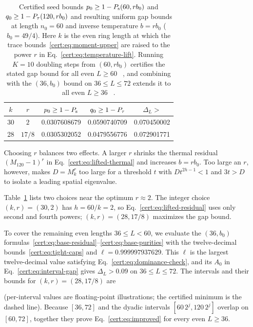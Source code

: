 \begin{table}[t]
    \caption{Certified seed bounds $p_0\ge1-P_{\mathrm s}(60,rb_0)$ and
        $q_0\ge1-P_{\tau}(120,rb_0)$%
        and resulting uniform gap bounds at length
        $n_0=60$ and inverse temperature $b=rb_0$ ($b_0=49/4$). Here $k$ is the
        even ring length at which the trace bounds~\eqref{cert:eq:moment-upper}
        are raised to the power $r$ in Eq.~\eqref{cert:eq:temperature-lift}.
        Running $K=10$ doubling steps from $(60,rb_0)$ certifies the stated gap
        bound for all even $L\ge60$%
        ~,
        and combining with the $(36,b_0)$ bound on
        $36\le L\le72$ extends it to all even $L\ge36$%
        ~.}
    \label{cert:tab:lifted}
    \begin{tabular}{@{}ccccc@{}}
        \toprule
        $k$ & $r$    & $p_0\ge1-P_{\mathrm s}$ & $q_0\ge1-P_{\tau}$ & $\Delta_L>$ \\
        \midrule
        30  & $2$    & 0.0307608679  & 0.0590740709  & 0.070450002 \\
        28  & $17/8$ & 0.0305302052  & 0.0479556776  & 0.072901771 \\
        \bottomrule
    \end{tabular}
\end{table}

Choosing $r$ balances two effects. A larger $r$ shrinks the thermal
residual $(M_{120}-1)^r$ in Eq.~\eqref{cert:eq:lifted-thermal} and
increases $b=rb_0$. Too large an $r$, however, makes $D=M_k^r$ too large
for a threshold $t$ with $Dt^{2h-1}<1$ and $3t>D$ to isolate a leading spatial
eigenvalue.

Table~\ref{cert:tab:lifted} lists two choices near the optimum
$r\approx2$. The integer choice $(k,r)=(30,2)$ has $h=60/k=2$, so
Eq.~\eqref{cert:eq:lifted-residual} uses only second and fourth powers;
$(k,r)=(28,17/8)$ maximizes the gap bound.

To cover the remaining even lengths $36\le L<60$, we evaluate the
$(36,b_0)$ formulas~\eqref{cert:eq:base-residual}--\eqref{cert:eq:base-purities}
with the twelve-decimal bounds~\eqref{cert:eq:tight-caps} and
$\ell=0.999997937629$. This $\ell$ is the largest twelve-decimal value
satisfying Eq.~\eqref{cert:eq:dominance-check}, and its $A_0$ in
Eq.~\eqref{cert:eq:interval-gap} gives $\Delta_L>0.09$ on $36\le L\le72$.
The intervals and their bounds for $(k,r)=(28,17/8)$ are
\begin{proofdiagram}
    \coveragefigure
\end{proofdiagram}
(per-interval values are floating-point illustrations; the certified
minimum is the dashed line). Because $[36,72]$ and the dyadic intervals
$[60\,2^j,120\,2^j]$ overlap on $[60,72]$, together they prove
Eq.~\eqref{cert:eq:improved} for every even $L\ge36$.
